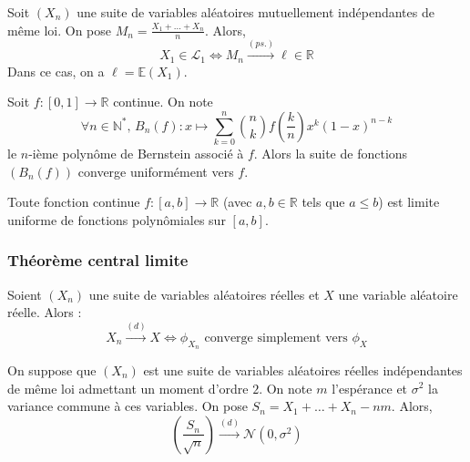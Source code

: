 
  \begin{theorem}
    Soit $(X_n)$ une suite de variables aléatoires mutuellement indépendantes de même loi. On pose $M_n = \frac{X_1 + \dots + X_n}{n}$. Alors,
    \[ X_1 \in \mathcal{L}_1 \iff M_n \overset{(ps.)}{\longrightarrow} \ell \in \mathbb{R} \]
    Dans ce cas, on a $\ell = \mathbb{E}(X_1)$.
  \end{theorem}


  \begin{application}
    Soit $f : [0,1] \rightarrow \mathbb{R}$ continue. On note
    \[ \forall n \in \mathbb{N}^*, \, B_n(f) : x \mapsto \sum_{k=0}^n \binom{n}{k} f \left( \frac{k}{n} \right) x^k (1-x)^{n-k} \]
    le $n$-ième polynôme de Bernstein associé à $f$. Alors la suite de fonctions $(B_n(f))$ converge uniformément vers $f$.
  \end{application}


  \begin{corollary}
    Toute fonction continue $f : [a,b] \rightarrow \mathbb{R}$ (avec $a, b \in \mathbb{R}$ tels que $a \leq b$) est limite uniforme de fonctions polynômiales sur $[a, b]$.
  \end{corollary}

  \subsubsection{Théorème central limite}


  \begin{theorem}[Lévy]
    \label{theoreme-central-limite-1}
    Soient $(X_n)$ une suite de variables aléatoires réelles et $X$ une variable aléatoire réelle. Alors :
    \[ X_n \overset{(d)}{\longrightarrow} X \iff \phi_{X_n} \text{ converge simplement vers } \phi_X \]
  \end{theorem}


  \begin{theorem}
    On suppose que $(X_n)$ est une suite de variables aléatoires réelles indépendantes de même loi admettant un moment d'ordre $2$. On note $m$ l'espérance et $\sigma^2$ la variance commune à ces variables. On pose $S_n = X_1 + \dots + X_n - nm$. Alors,
    \[ \left ( \frac{S_n}{\sqrt{n}} \right) \overset{(d)}{\longrightarrow} \mathcal{N}(0, \sigma^2) \]
  \end{theorem}

